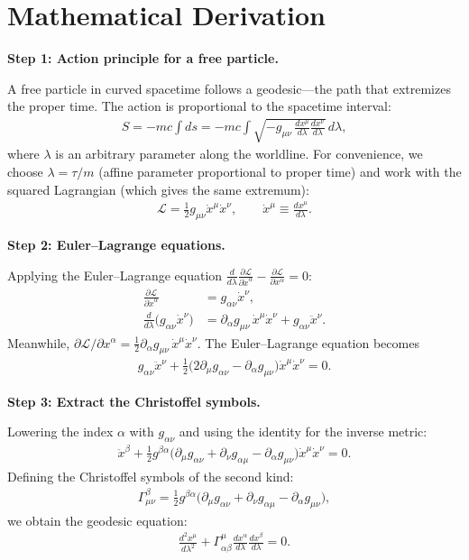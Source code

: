 \section*{Mathematical Derivation}

\textbf{Step 1: Action principle for a free particle.}

A free particle in curved spacetime follows a geodesic---the path that extremizes the proper time. The action is proportional to the spacetime interval:
\begin{align}
S = -mc\int ds = -mc\int \sqrt{-g_{\mu\nu}\,\frac{dx^\mu}{d\lambda}\frac{dx^\nu}{d\lambda}}\,d\lambda,
\end{align}
where $\lambda$ is an arbitrary parameter along the worldline. For convenience, we choose $\lambda = \tau/m$ (affine parameter proportional to proper time) and work with the squared Lagrangian (which gives the same extremum):
\begin{align}
\mathcal{L} = \frac{1}{2}g_{\mu\nu}\dot{x}^\mu\dot{x}^\nu, \qquad \dot{x}^\mu \equiv \frac{dx^\mu}{d\lambda}.
\end{align}

\textbf{Step 2: Euler--Lagrange equations.}

Applying the Euler--Lagrange equation $\frac{d}{d\lambda}\frac{\partial\mathcal{L}}{\partial\dot{x}^\alpha} - \frac{\partial\mathcal{L}}{\partial x^\alpha} = 0$:
\begin{align}
\frac{\partial\mathcal{L}}{\partial\dot{x}^\alpha} &= g_{\alpha\nu}\dot{x}^\nu, \\
\frac{d}{d\lambda}\bigl(g_{\alpha\nu}\dot{x}^\nu\bigr) &= \partial_\alpha g_{\mu\nu}\,\dot{x}^\mu\dot{x}^\nu + g_{\alpha\nu}\ddot{x}^\nu.
\end{align}
Meanwhile, $\partial\mathcal{L}/\partial x^\alpha = \frac{1}{2}\partial_\alpha g_{\mu\nu}\,\dot{x}^\mu\dot{x}^\nu$. The Euler--Lagrange equation becomes
\begin{align}
g_{\alpha\nu}\ddot{x}^\nu + \frac{1}{2}\bigl(2\partial_\mu g_{\alpha\nu} - \partial_\alpha g_{\mu\nu}\bigr)\dot{x}^\mu\dot{x}^\nu = 0.
\end{align}

\textbf{Step 3: Extract the Christoffel symbols.}

Lowering the index $\alpha$ with $g_{\alpha\nu}$ and using the identity for the inverse metric:
\begin{align}
\ddot{x}^\beta + \frac{1}{2}g^{\beta\alpha}\bigl(\partial_\mu g_{\alpha\nu} + \partial_\nu g_{\alpha\mu} - \partial_\alpha g_{\mu\nu}\bigr)\dot{x}^\mu\dot{x}^\nu = 0.
\end{align}
Defining the Christoffel symbols of the second kind:
\begin{align}
\Gamma^\beta_{\mu\nu} = \frac{1}{2}g^{\beta\alpha}\bigl(\partial_\mu g_{\alpha\nu} + \partial_\nu g_{\alpha\mu} - \partial_\alpha g_{\mu\nu}\bigr),
\end{align}
we obtain the geodesic equation:
\begin{align}
\boxed{\frac{d^2 x^\mu}{d\lambda^2} + \Gamma^\mu_{\alpha\beta}\frac{dx^\alpha}{d\lambda}\frac{dx^\beta}{d\lambda} = 0.}
\end{align}

